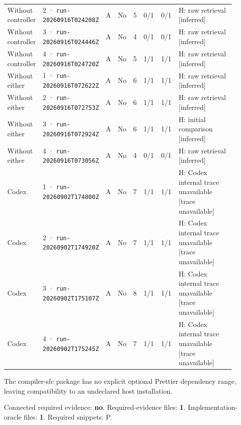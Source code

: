 \begin{landscape}
\begin{longtable}{@{}L{0.11\linewidth}L{0.16\linewidth}*{1}{L{0.022\linewidth}}L{0.05\linewidth}L{0.045\linewidth}L{0.08\linewidth}L{0.085\linewidth}L{0.368\linewidth}@{}}
Without controller & 2 · \texttt{run-20260916\allowbreak T024208Z} & A & No & 5 & 0/1 & 0/1 & H: raw retrieval [inferred] \\
Without controller & 3 · \texttt{run-20260916\allowbreak T024446Z} & A & No & 4 & 0/1 & 0/1 & H: raw retrieval [inferred] \\
Without controller & 4 · \texttt{run-20260916\allowbreak T024720Z} & A & No & 5 & 1/1 & 1/1 & H: raw retrieval [inferred] \\
Without either & 1 · \texttt{run-20260916\allowbreak T072622Z} & A & No & 6 & 1/1 & 1/1 & H: raw retrieval [inferred] \\
Without either & 2 · \texttt{run-20260916\allowbreak T072753Z} & A & No & 6 & 1/1 & 1/1 & H: raw retrieval [inferred] \\
Without either & 3 · \texttt{run-20260916\allowbreak T072924Z} & A & No & 6 & 1/1 & 1/1 & H: initial comparison [inferred] \\
Without either & 4 · \texttt{run-20260916\allowbreak T073056Z} & A & No & 4 & 0/1 & 0/1 & H: raw retrieval [inferred] \\
Codex & 1 · \texttt{run-20260902\allowbreak T174800Z} & A & No & 7 & 1/1 & 1/1 & H: Codex internal trace unavailable [trace unavailable] \\
Codex & 2 · \texttt{run-20260902\allowbreak T174920Z} & A & No & 7 & 1/1 & 1/1 & H: Codex internal trace unavailable [trace unavailable] \\
Codex & 3 · \texttt{run-20260902\allowbreak T175107Z} & A & No & 8 & 1/1 & 1/1 & H: Codex internal trace unavailable [trace unavailable] \\
Codex & 4 · \texttt{run-20260902\allowbreak T175245Z} & A & No & 7 & 1/1 & 1/1 & H: Codex internal trace unavailable [trace unavailable] \\
\end{longtable}
\endgroup
\end{landscape}

\label{sec:vuejs-vue-13052}

The compiler-sfc package has no explicit optional Prettier dependency range, leaving compatibility to an undeclared host installation.

Connected required evidence: \textbf{no}. Required-evidence files: \textbf{1}. Implementation-oracle files: \textbf{1}. Required snippets: P.

